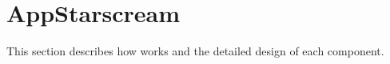 \section{AppStarscream}
\label{sec:approach}

This section describes how \nickName{} works and the detailed design of each component.







